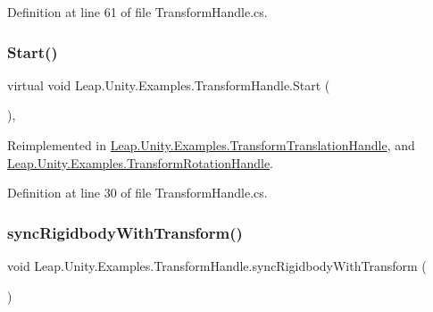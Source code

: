 Definition at line 61 of file Transform\+Handle.\+cs.

\mbox{\label{class_leap_1_1_unity_1_1_examples_1_1_transform_handle_ab2c8be5053c981fff46ab6b5f99cac13}} 
\subsubsection{\texorpdfstring{Start()}{Start()}}
{\footnotesize\ttfamily virtual void Leap.\+Unity.\+Examples.\+Transform\+Handle.\+Start (\begin{DoxyParamCaption}{ }\end{DoxyParamCaption})\hspace{0.3cm}{\ttfamily [protected]}, {\ttfamily [virtual]}}



Reimplemented in \mbox{\hyperlink{class_leap_1_1_unity_1_1_examples_1_1_transform_translation_handle_af127ad72e9df2429fab712a75b16e115}{Leap.\+Unity.\+Examples.\+Transform\+Translation\+Handle}}, and \mbox{\hyperlink{class_leap_1_1_unity_1_1_examples_1_1_transform_rotation_handle_a37171ac787856ac86358e300c11f4707}{Leap.\+Unity.\+Examples.\+Transform\+Rotation\+Handle}}.



Definition at line 30 of file Transform\+Handle.\+cs.

\mbox{\label{class_leap_1_1_unity_1_1_examples_1_1_transform_handle_a4f3a9141f2596e224e0cefcfe2e83625}} 
\subsubsection{\texorpdfstring{syncRigidbodyWithTransform()}{syncRigidbodyWithTransform()}}
{\footnotesize\ttfamily void Leap.\+Unity.\+Examples.\+Transform\+Handle.\+sync\+Rigidbody\+With\+Transform (\begin{DoxyParamCaption}{ }\end{DoxyParamCaption})}



